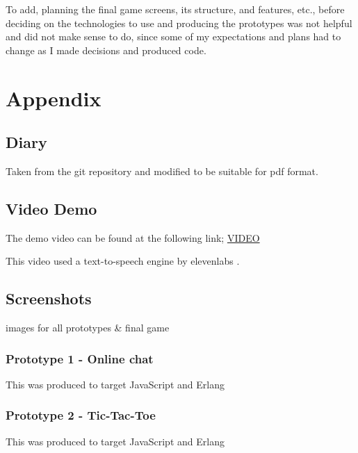 \documentclass[]{final}
\begin{document}
To add, planning the final game screens, its structure, and features, etc., before
deciding on the technologies to use and producing the prototypes was not helpful and
did not make sense to do, since some of my expectations and plans had to change as I
made decisions and produced code.


\newpage
{}


\chapter{Appendix}
\section{Diary}
Taken from the git repository and modified to be suitable for pdf format.


\section{Video Demo}
The demo video can be found at the following link; \href{https://youtu.be/jvWuQHjNPdc}{VIDEO}

This video used a text-to-speech engine by elevenlabs \cite{noauthor_ai_nodate}.

\section{Screenshots}
images for all prototypes \& final game%
\subsection{Prototype 1 - Online chat}
This was produced to target JavaScript and Erlang%
\subsection{Prototype 2 - Tic-Tac-Toe}
This was produced to target JavaScript and Erlang%
\end{document}
